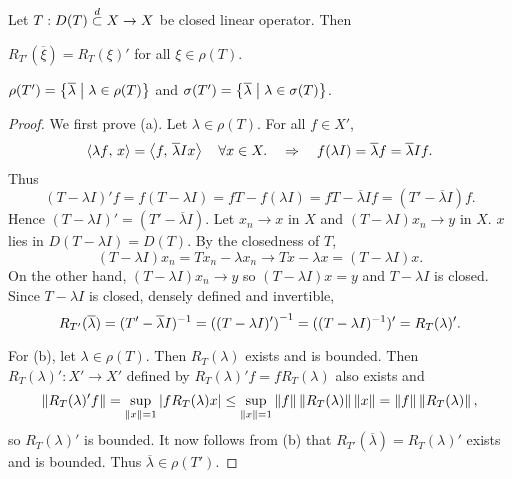 \begin{theorem}
    Let $T:D(T)\overset{d}{\subset} X\to X$ be closed linear operator. Then 
    \begin{thmenum}
        \item $R_{T'}(\overline{\xi}) = R_T(\xi)'$ for all $\xi\in\rho(T)$. 
        \item $\rho(T') = \left\{ \overline{\lambda} \;\middle\vert\; \lambda\in\rho(T) \right\}$ and 
        $\sigma(T') = \left\{ \overline{\lambda} \;\middle\vert\; \lambda\in\sigma(T) \right\}$.
    \end{thmenum}
\end{theorem}
\begin{proof}
    We first prove (a). Let $\lambda\in\rho(T)$. For all $f\in X'$, 
    \begin{equation*}
        \left\langle {\lambda f},\, {x} \right\rangle = \left\langle {f},\, {\overline{\lambda}Ix} \right\rangle\quad\forall x\in X. 
        \quad\Rightarrow\quad 
        f(\lambda I) = \overline{\lambda}f = \overline{\lambda}If.
    \end{equation*}
    Thus 
    \begin{equation*}
        (T-\lambda I)'f = f(T-\lambda I) = fT - f(\lambda I) 
        = fT - \overline{\lambda}If = (T'-\overline{\lambda}I)f.
    \end{equation*}
    Hence $(T-\lambda I)' = (T'-\overline{\lambda}I)$. Let $x_n\to x$ 
    in $X$ and $(T-\lambda I)x_n\to y$ in $X$. $x$ lies in $D(T-\lambda I) 
    = D(T)$. By the closedness of $T$, 
    \begin{equation*}
        (T-\lambda I)x_n = Tx_n - \lambda x_n \to Tx - \lambda x = (T-\lambda I)x.
    \end{equation*}
    On the other hand, $(T-\lambda I)x_n\to y$ so $(T-\lambda I)x = y$ and 
    $T-\lambda I$ is closed. Since $T-\lambda I$ is closed, densely defined 
    and invertible, 
    \begin{equation*}
        R_{T'}(\overline{\lambda}) = (T'-\overline{\lambda}I)^{-1} 
        = \pth{(T-\lambda I)'}^{-1} = ((T-\lambda I)^{-1})' = R_T(\lambda)'.
    \end{equation*}

    For (b), let $\lambda\in\rho(T)$. Then $R_T(\lambda)$ exists 
    and is bounded. Then $R_T(\lambda)':X'\to X'$ defined by 
    $R_T(\lambda)'f = fR_T(\lambda)$ also exists and 
    \begin{equation*}
        \left\lVert {R_T(\lambda)'f} \right\rVert = \sup_{\left\lVert {x} \right\rVert=1}\left\lvert {fR_T(\lambda)x} \right\rvert 
        \leq \sup_{\left\lVert {x} \right\rVert=1}\left\lVert {f} \right\rVert\left\lVert {R_T(\lambda)} \right\rVert\left\lVert {x} \right\rVert 
        = \left\lVert {f} \right\rVert\left\lVert {R_T(\lambda)} \right\rVert,
    \end{equation*} 
    so $R_T(\lambda)'$ is bounded. It now follows from (b) that 
    $R_{T'}(\overline{\lambda}) = R_T(\lambda)'$ exists and is bounded. 
    Thus $\overline{\lambda}\in\rho(T')$. 


\end{proof}
